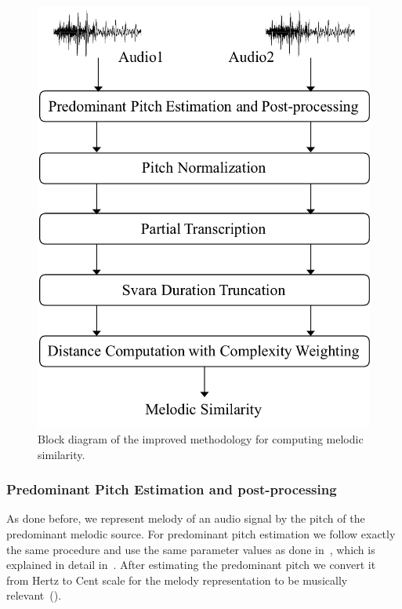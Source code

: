 \begin{figure}
	\begin{center}
		\includegraphics[width=\figSizeSixty]{ch06_patterns/figures/ImprovingSimilarity/melodic_similarity_improve_blockd.pdf}
	\end{center}
	\caption[Block diagram for an improved melodic similarity computation]{Block diagram of the improved methodology for computing melodic similarity.} 
	\label{fig:block_diagram_melodic_similarity_improved}
\end{figure}

\subsubsection{Predominant Pitch Estimation and post-processing}
\label{sec:patterns_improving_similarity_melody_estimation}

As done before, we represent melody of an audio signal by the pitch of the predominant melodic source. For predominant pitch estimation we follow exactly the same procedure and use the same parameter values as done in~, which is explained in detail in~. After estimating the predominant pitch we convert it from Hertz to Cent scale for the melody representation to be musically relevant~().


